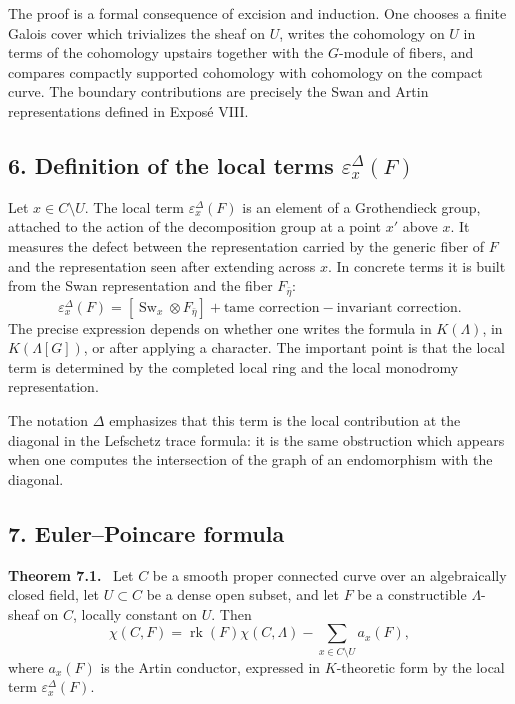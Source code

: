 \documentclass[11pt]{article}
\theoremstyle{plain}
\theoremstyle{definition}
\theoremstyle{remark}
\newenvironment{statement}[1]{\par\medskip\noindent\textbf{#1.}\ }{\par\medskip}
\providecommand{\Sw}{\operatorname{Sw}}
\begin{document}
The proof is a formal consequence of excision and induction. One chooses a finite Galois cover which trivializes the sheaf on $U$, writes the cohomology on $U$ in terms of the cohomology upstairs together with the $G$-module of fibers, and compares compactly supported cohomology with cohomology on the compact curve. The boundary contributions are precisely the Swan and Artin representations defined in Expos\'e VIII.

\subsection*{6. Definition of the local terms $\varepsilon_x^\Delta(F)$}

Let $x\in C\setminus U$. The local term $\varepsilon_x^\Delta(F)$ is an element of a Grothendieck group, attached to the action of the decomposition group at a point $x'$ above $x$. It measures the defect between the representation carried by the generic fiber of $F$ and the representation seen after extending across $x$. In concrete terms it is built from the Swan representation and the fiber $F_{\bar\eta}$:
\[
   \varepsilon_x^\Delta(F)
      = [\Sw_x\otimes F_{\bar\eta}]+\text{tame correction}-\text{invariant correction}.
\]
The precise expression depends on whether one writes the formula in $K(\Lambda)$, in $K(\Lambda[G])$, or after applying a character. The important point is that the local term is determined by the completed local ring and the local monodromy representation.

The notation $\Delta$ emphasizes that this term is the local contribution at the diagonal in the Lefschetz trace formula: it is the same obstruction which appears when one computes the intersection of the graph of an endomorphism with the diagonal.

\subsection*{7. Euler--Poincare formula}

\begin{statement}{Theorem 7.1}
Let $C$ be a smooth proper connected curve over an algebraically closed field, let $U\subset C$ be a dense open subset, and let $F$ be a constructible $\Lambda$-sheaf on $C$, locally constant on $U$. Then
\[
   \chi(C,F)=\operatorname{rk}(F)\chi(C,\Lambda)
      -\sum_{x\in C\setminus U} a_x(F),
\]
where $a_x(F)$ is the Artin conductor, expressed in $K$-theoretic form by the local term $\varepsilon_x^\Delta(F)$.
\end{statement}
\end{document}
